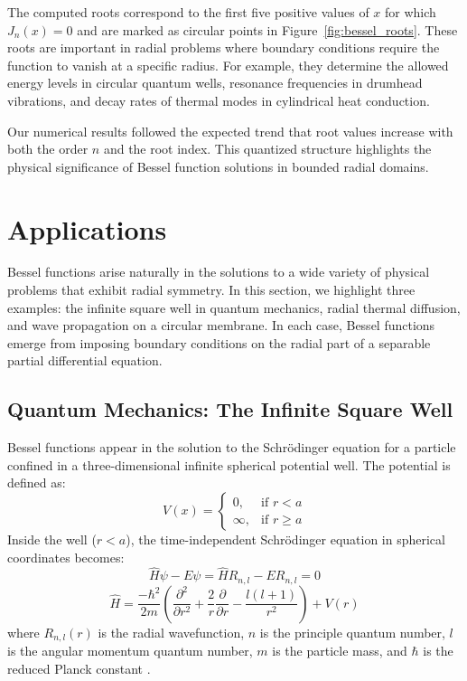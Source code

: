 \documentclass[linenumbers, twocolumn]{aastex631}
\begin{document}
\noindent The computed roots correspond to the first five positive values of $x$
for which $J_n(x)=0$ and are marked as circular points in Figure~\ref{fig:bessel_roots}.
These roots are important in radial problems where boundary conditions require the
function to vanish at a specific radius. For example, they determine the allowed
energy levels in circular quantum wells, resonance frequencies in drumhead 
vibrations, and decay rates of thermal modes in cylindrical heat conduction.

\noindent Our numerical results followed the expected trend that root values
increase with both the order $n$ and the root index. This quantized structure
highlights the physical significance of Bessel function solutions in bounded
radial domains.\\


\section{Applications} \label{sec:applications}

Bessel functions arise naturally in the solutions to a wide variety of physical
problems that exhibit radial symmetry. In this section, we highlight three
examples: the infinite square well in quantum mechanics, radial thermal
diffusion, and wave propagation on a circular membrane. In each case, Bessel
functions emerge from imposing boundary conditions on the radial part of a 
separable partial differential equation.\\

\subsection{Quantum Mechanics: The Infinite Square Well}

Bessel functions appear in the solution to the Schrödinger equation for a
particle confined in a three-dimensional infinite spherical potential well.
The potential is defined as:
\begin{equation}
    V(x)=
    \begin{cases}
        0, &\text{if }r < a\\
        \infty, &\text{if }r\geq a
    \end{cases}
\end{equation}
\noindent Inside the well ($r < a$), the time-independent Schrödinger equation in
spherical coordinates becomes:
\begin{equation}
    \hat{H}\psi-E\psi=\hat{H}R_{n,l}-ER_{n,l}=0
\end{equation}
\begin{equation}
    \hat{H}=\frac{-\hbar ^2}{2m}\left(\frac{\partial^2}{\partial r^2} + \frac{2}{r} \frac{\partial}{\partial r} - \frac{l(l+1)}{r^2}\right) +V(r)
\end{equation}
\noindent where $R_{n,l}(r)$ is the radial wavefunction, $n$ is the principle
quantum number, $l$ is the angular momentum quantum number, $m$ is the
particle mass, and $\hbar$ is the reduced Planck constant \citet{hanson}.
\end{document}
